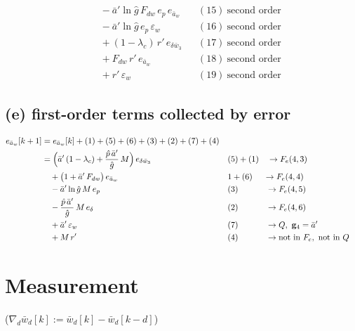 \documentclass[11pt,a4paper,fontset=none]{ctexart}
\newcommand{\ba}{\bar{a}}
\newcommand{\bw}{\bar{w}}
\newcommand{\ap}{\ba'}
\newcommand{\ph}{\hat{p}}
\newcommand{\dl}{\delta}
\newcommand{\gh}{\hat{g}}
\begin{document}
\begin{align*}
  &\quad - \ap\ln\gh\,F_{dw}\,e_p\,e_{\ba_w}                                       && (15)\ \text{second order} \\
  &\quad - \ap\ln\gh\,e_p\,\varepsilon_w                                           && (16)\ \text{second order} \\
  &\quad + (1-\lambda_c)\,r'\,e_{\delta\bw_3}                                     && (17)\ \text{second order} \\
  &\quad + F_{dw}\,r'\,e_{\ba_w}                                                  && (18)\ \text{second order} \\
  &\quad + r'\,\varepsilon_w                                                      && (19)\ \text{second order}
\end{align*}

\subsection*{(e) first-order terms collected by error}

\begin{align*}
e_{\ba_w}[k+1]
  &= e_{\ba_w}[k] + (1) + (5) + (6) + (3) + (2) + (7) + (4) \\
  &= \Bigl(\ap\,(1-\lambda_c) + \frac{\ph\,\ap}{\gh}\,M\Bigr)\,e_{\delta\bw_3}    && (5) + (1) \quad \to F_e(4,3) \\
  &\quad + \bigl(1 + \ap\,F_{dw}\bigr)\,e_{\ba_w}                                 && 1 + (6) \quad\ \to F_e(4,4) \\
  &\quad - \ap\ln\gh\,M\,e_p                                                      && (3) \qquad\quad\ \to F_e(4,5) \\
  &\quad - \frac{\ph\,\ap}{\gh}\,M\,e_{\dl}                                       && (2) \qquad\quad\ \to F_e(4,6) \\
  &\quad + \ap\,\varepsilon_w                                                     && (7) \qquad\quad\ \to Q,\ \mathbf{g}_4 = \ap \\
  &\quad + M\,r'                                                                  && (4) \qquad\quad\ \to \text{not in } F_e,\ \text{not in } Q
\end{align*}

\newpage
\section{Measurement}

($\nabla_d\bw_d[k] := \bw_d[k] - \bw_d[k-d]$)
\end{document}
